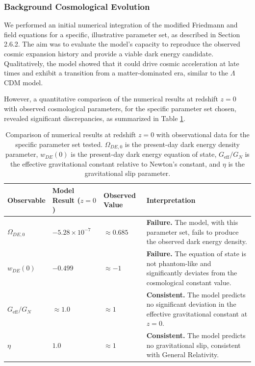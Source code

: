 \documentclass[twocolumn]{aastex631}
\begin{document}
\subsubsection{Background Cosmological Evolution}
We performed an initial numerical integration of the modified Friedmann and field equations for a specific, illustrative parameter set, as described in Section 2.6.2. The aim was to evaluate the model's capacity to reproduce the observed cosmic expansion history and provide a viable dark energy candidate. Qualitatively, the model showed that it could drive cosmic acceleration at late times and exhibit a transition from a matter-dominated era, similar to the $\Lambda$CDM model.

However, a quantitative comparison of the numerical results at redshift $z=0$ with observed cosmological parameters, for the specific parameter set chosen, revealed significant discrepancies, as summarized in Table \ref{tab:cosmo_results}.

\begin{table}[ht!]
\caption{Comparison of numerical results at redshift $z=0$ with observational data for the specific parameter set tested. $\Omega_{DE,0}$ is the present-day dark energy density parameter, $w_{DE}(0)$ is the present-day dark energy equation of state, $G_{\text{eff}}/G_N$ is the effective gravitational constant relative to Newton's constant, and $\eta$ is the gravitational slip parameter.}
\label{tab:cosmo_results}
\centering
\begin{tabular}{p{} p{} p{} p{}}
\toprule
\textbf{Observable} & \textbf{Model Result ($z=0$)} & \textbf{Observed Value} & \textbf{Interpretation} \\
\midrule
$\Omega_{DE,0}$ & $-5.28 \times 10^{-7}$ & $\approx 0.685$ & \textbf{Failure.} The model, with this parameter set, fails to produce the observed dark energy density. \\
$w_{DE}(0)$ & $-0.499$ & $\approx -1$ & \textbf{Failure.} The equation of state is not phantom-like and significantly deviates from the cosmological constant value. \\
$G_{\text{eff}}/G_N$ & $\approx 1.0$ & $\approx 1$ & \textbf{Consistent.} The model predicts no significant deviation in the effective gravitational constant at $z=0$. \\
$\eta$ & $1.0$ & $\approx 1$ & \textbf{Consistent.} The model predicts no gravitational slip, consistent with General Relativity. \\
\bottomrule
\end{tabular}
\end{table}
\end{document}
